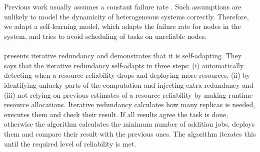 \documentclass{cslthse-msc}
\begin{document}
\\\\
Previous work usually assumes a constant failure rate \cite{algoMaxRelEndToEndConstraint} \cite{algoMinExTime} \cite{relModelDistSimSystem} \cite{optTaskAllocationForMaxRel} \cite{perfImplPerCheckPoint}. Such assumptions are unlikely to model the dynamicity of heterogeneous systems correctly. Therefore, we adapt a self-learning model, which adapts the failure rate for nodes in the system, and tries to avoid scheduling of tasks on unreliable nodes.
\\\\
\cite{selfAdaptRel} presents iterative redundancy and demonstrates that it is self-adapting. They says that the iterative redundancy self-adapts in three steps: (i) automatically detecting when a resource reliability drops and deploying more resources, (ii) by identifying unlucky parts of the computation and injecting extra redundancy and (iii) not relying on previous estimates of a resource reliability by making runtime resource allocations. Iterative redundancy calculates how many replicas is needed, executes them and check their result. If all results agree the task is done, otherwise the algorithm calculates the minimum number of addition jobs, deploys them and compare their result with the previous ones. The algorithm iterates this until the required level of reliability is met.
\end{document}

